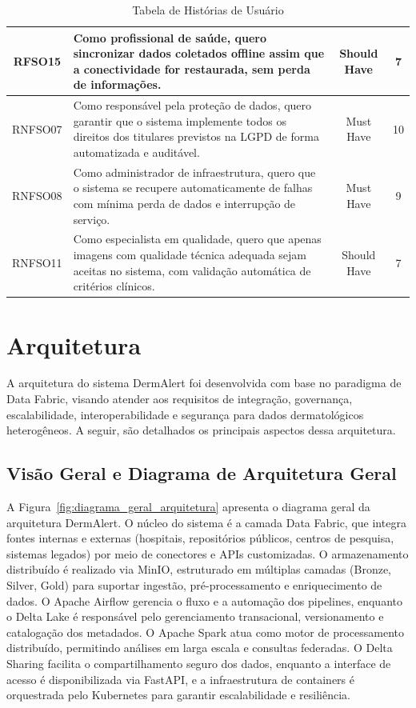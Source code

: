 \begin{table}[H]
\begin{tabular}{|c|p{7cm}|c|c|}
    RFSO15 & Como profissional de saúde, quero sincronizar dados coletados offline assim que a conectividade for restaurada, sem perda de informações. & Should Have & 7 \\ \hline
    RNFSO07 & Como responsável pela proteção de dados, quero garantir que o sistema implemente todos os direitos dos titulares previstos na LGPD de forma automatizada e auditável. & Must Have & 10 \\ \hline
    RNFSO08 & Como administrador de infraestrutura, quero que o sistema se recupere automaticamente de falhas com mínima perda de dados e interrupção de serviço. & Must Have & 9 \\ \hline
    RNFSO11 & Como especialista em qualidade, quero que apenas imagens com qualidade técnica adequada sejam aceitas no sistema, com validação automática de critérios clínicos. & Should Have & 7 \\ \hline
    \end{tabular}
    \caption{Tabela de Histórias de Usuário}
    \label{tab:historias_usuario}
\end{table}



\section{Arquitetura}

A arquitetura do sistema DermAlert foi desenvolvida com base no paradigma de Data Fabric, visando atender aos requisitos de integração, governança, escalabilidade, interoperabilidade e segurança para dados dermatológicos heterogêneos. A seguir, são detalhados os principais aspectos dessa arquitetura.

\subsection{Visão Geral e Diagrama de Arquitetura Geral}

A Figura~\ref{fig:diagrama_geral_arquitetura} apresenta o diagrama geral da arquitetura DermAlert. O núcleo do sistema é a camada Data Fabric, que integra fontes internas e externas (hospitais, repositórios públicos, centros de pesquisa, sistemas legados) por meio de conectores e APIs customizadas. O armazenamento distribuído é realizado via MinIO, estruturado em múltiplas camadas (Bronze, Silver, Gold) para suportar ingestão, pré-processamento e enriquecimento de dados. O Apache Airflow gerencia o fluxo e a automação dos pipelines, enquanto o Delta Lake é responsável pelo gerenciamento transacional, versionamento e catalogação dos metadados. O Apache Spark atua como motor de processamento distribuído, permitindo análises em larga escala e consultas federadas. O Delta Sharing facilita o compartilhamento seguro dos dados, enquanto a interface de acesso é disponibilizada via FastAPI, e a infraestrutura de containers é orquestrada pelo Kubernetes para garantir escalabilidade e resiliência.

